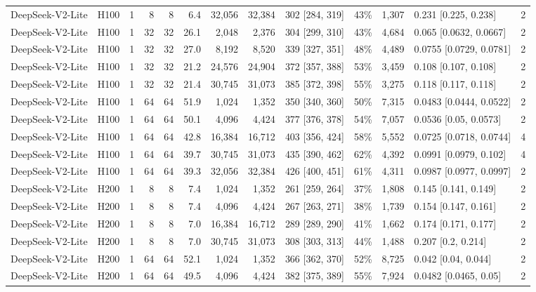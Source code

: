 \begin{landscape}
\begin{longtable}{llrrrrrrlrrlr}
DeepSeek-V2-Lite & H100 & 1 & 8 & 8 & 6.4 & 32,056 & 32,384 & 302 {[}284, 319{]} & 43\% & 1,307 & 0.231 {[}0.225, 0.238{]} & 2 \\
DeepSeek-V2-Lite & H100 & 1 & 32 & 32 & 26.1 & 2,048 & 2,376 & 304 {[}299, 310{]} & 43\% & 4,684 & 0.065 {[}0.0632, 0.0667{]} & 2 \\
DeepSeek-V2-Lite & H100 & 1 & 32 & 32 & 27.0 & 8,192 & 8,520 & 339 {[}327, 351{]} & 48\% & 4,489 & 0.0755 {[}0.0729, 0.0781{]} & 2 \\
DeepSeek-V2-Lite & H100 & 1 & 32 & 32 & 21.2 & 24,576 & 24,904 & 372 {[}357, 388{]} & 53\% & 3,459 & 0.108 {[}0.107, 0.108{]} & 2 \\
DeepSeek-V2-Lite & H100 & 1 & 32 & 32 & 21.4 & 30,745 & 31,073 & 385 {[}372, 398{]} & 55\% & 3,275 & 0.118 {[}0.117, 0.118{]} & 2 \\
DeepSeek-V2-Lite & H100 & 1 & 64 & 64 & 51.9 & 1,024 & 1,352 & 350 {[}340, 360{]} & 50\% & 7,315 & 0.0483 {[}0.0444, 0.0522{]} & 2 \\
DeepSeek-V2-Lite & H100 & 1 & 64 & 64 & 50.1 & 4,096 & 4,424 & 377 {[}376, 378{]} & 54\% & 7,057 & 0.0536 {[}0.05, 0.0573{]} & 2 \\
DeepSeek-V2-Lite & H100 & 1 & 64 & 64 & 42.8 & 16,384 & 16,712 & 403 {[}356, 424{]} & 58\% & 5,552 & 0.0725 {[}0.0718, 0.0744{]} & 4 \\
DeepSeek-V2-Lite & H100 & 1 & 64 & 64 & 39.7 & 30,745 & 31,073 & 435 {[}390, 462{]} & 62\% & 4,392 & 0.0991 {[}0.0979, 0.102{]} & 4 \\
DeepSeek-V2-Lite & H100 & 1 & 64 & 64 & 39.3 & 32,056 & 32,384 & 426 {[}400, 451{]} & 61\% & 4,311 & 0.0987 {[}0.0977, 0.0997{]} & 2 \\
DeepSeek-V2-Lite & H200 & 1 & 8 & 8 & 7.4 & 1,024 & 1,352 & 261 {[}259, 264{]} & 37\% & 1,808 & 0.145 {[}0.141, 0.149{]} & 2 \\
DeepSeek-V2-Lite & H200 & 1 & 8 & 8 & 7.4 & 4,096 & 4,424 & 267 {[}263, 271{]} & 38\% & 1,739 & 0.154 {[}0.147, 0.161{]} & 2 \\
DeepSeek-V2-Lite & H200 & 1 & 8 & 8 & 7.0 & 16,384 & 16,712 & 289 {[}289, 290{]} & 41\% & 1,662 & 0.174 {[}0.171, 0.177{]} & 2 \\
DeepSeek-V2-Lite & H200 & 1 & 8 & 8 & 7.0 & 30,745 & 31,073 & 308 {[}303, 313{]} & 44\% & 1,488 & 0.207 {[}0.2, 0.214{]} & 2 \\
DeepSeek-V2-Lite & H200 & 1 & 64 & 64 & 52.1 & 1,024 & 1,352 & 366 {[}362, 370{]} & 52\% & 8,725 & 0.042 {[}0.04, 0.044{]} & 2 \\
DeepSeek-V2-Lite & H200 & 1 & 64 & 64 & 49.5 & 4,096 & 4,424 & 382 {[}375, 389{]} & 55\% & 7,924 & 0.0482 {[}0.0465, 0.05{]} & 2 \\

\end{longtable}
\end{landscape}
